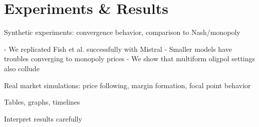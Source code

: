 \section{Experiments \& Results}

Synthetic experiments: convergence behavior, comparison to Nash/monopoly

- We replicated Fish et al. successfully with Mistral
- Smaller models have troubles converging to monopoly prices
- We show that multiform oligpol settings also collude



Real market simulations: price following, margin formation, focal point behavior

Tables, graphs, timelines

Interpret results carefully
